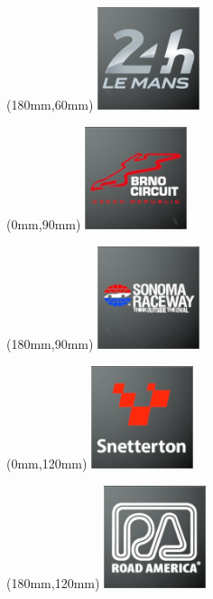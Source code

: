 \begin{textblock*}{30mm}(180mm,60mm)%
\includegraphics[width=30mm]{LG/2015-05-20_00084.png}
\end{textblock*}
\begin{textblock*}{30mm}(0mm,90mm)%
\includegraphics[width=30mm]{LG/2015-05-20_00075.png}
\end{textblock*}
\begin{textblock*}{30mm}(180mm,90mm)%
\includegraphics[width=30mm]{LG/2015-05-20_00096.png}
\end{textblock*}
\begin{textblock*}{30mm}(0mm,120mm)%
\includegraphics[width=30mm]{LG/2015-05-20_00095.png}
\end{textblock*}
\begin{textblock*}{30mm}(180mm,120mm)%
\includegraphics[width=30mm]{LG/2015-05-20_00092.png}
\end{textblock*}
